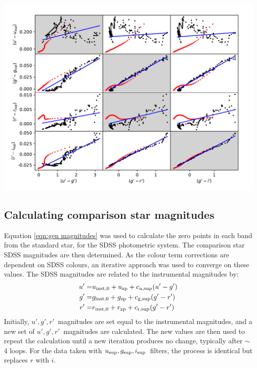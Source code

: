 \begin{minipage}{\linewidth}
    \includegraphics[width=\textwidth]{figures/observations/colour_term_tracks_HCAM.pdf}
    \label{fig:HiPERCAM colour corrections}
\end{minipage}


\subsection{Calculating comparison star magnitudes}
\label{sect:comparison star mag calc}

Equation \ref{eqn:gen magnitudes} was used to calculate the zero points in each band from the standard star, for the SDSS photometric system.
The comparison star SDSS magnitudes are then determined. As the colour term corrections are dependent on SDSS colours, an iterative approach was used to converge on these values. The SDSS magnitudes are related to the instrumental magnitudes by:
\begin{align*}
    u' =& u_{\rm inst,0} + u_{\rm zp} + c_{\rm u, sup}(u' - g') \\
    g' =& g_{\rm inst,0} + g_{\rm zp} + c_{\rm g, sup}(g' - r') \\
    r' =& r_{\rm inst,0} + r_{\rm zp} + c_{\rm r, sup}(g' - r')
\end{align*}
Initially, $u',g',r'$\ magnitudes are set equal to the instrumental magnitudes, and a new set of $u',g',r'$\ magnitudes are calculated. The new values are then used to repeat the calculation until a new iteration produces no change, typically after $\sim$4 loops. For the data taken with $u_{\rm sup},g_{\rm sup},i_{\rm sup}$\ filters, the process is identical but replaces $r$ with $i$.


